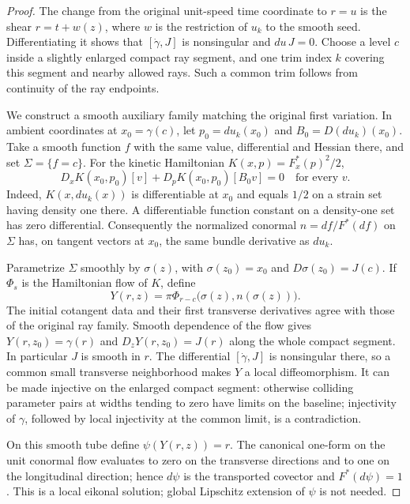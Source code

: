 \documentclass[11pt,reqno]{amsart}
\theoremstyle{definition}
\theoremstyle{remark}
\numberwithin{equation}{section}
\begin{document}
\begin{proof}
The change from the original unit-speed time coordinate to \(r=u\)
is the shear \(r=t+w(z)\), where \(w\) is the restriction of \(u_k\)
to the smooth seed. Differentiating it shows that
\([\dot\gamma,J]\) is nonsingular and \(du\,J=0\).
Choose a level \(c\) inside a slightly enlarged compact ray segment,
and one trim index \(k\) covering this segment and nearby allowed
rays. Such a common trim follows from continuity of the ray endpoints.

We construct a smooth auxiliary family matching the original first
variation. In ambient coordinates at \(x_0=\gamma(c)\), let
\(p_0=du_k(x_0)\) and \(B_0=D(du_k)(x_0)\). Take a smooth function
\(f\) with the same value, differential and Hessian there, and set
\(\Sigma=\{f=c\}\). For the kinetic Hamiltonian
\(K(x,p)=F_x^*(p)^2/2\),
\begin{equation}
D_xK(x_0,p_0)[v]+D_pK(x_0,p_0)[B_0v]=0
\quad\text{for every }v.
\label{eq:rough-eikonal-jet}
\end{equation}
Indeed, \(K(x,du_k(x))\) is differentiable at \(x_0\) and equals
\(1/2\) on a strain set having density one there. A differentiable
function constant on a density-one set has zero differential.
Consequently the normalized conormal
\(n=df/F^*(df)\) on \(\Sigma\) has, on tangent vectors at \(x_0\),
the same bundle derivative as \(du_k\).

Parametrize \(\Sigma\) smoothly by \(\sigma(z)\), with
\(\sigma(z_0)=x_0\) and \(D\sigma(z_0)=J(c)\). If \(\Phi_s\) is the Hamiltonian flow of
\(K\), define
\[
Y(r,z)=\pi\Phi_{r-c}\bigl(\sigma(z),n(\sigma(z))\bigr).
\]
The initial cotangent data and their first transverse derivatives
agree with those of the original ray family. Smooth dependence of
the flow gives
\(Y(r,z_0)=\gamma(r)\) and \(D_zY(r,z_0)=J(r)\) along the whole
compact segment. In particular \(J\) is smooth in \(r\).
The differential \([\dot\gamma,J]\) is nonsingular there, so a
common small transverse neighborhood makes \(Y\) a local
diffeomorphism. It can be made injective on the enlarged compact
segment: otherwise colliding parameter pairs at widths tending to
zero have limits on the baseline; injectivity of \(\gamma\), followed
by local injectivity at the common limit, is a contradiction.

On this smooth tube define \(\psi(Y(r,z))=r\). The canonical
one-form on the unit conormal flow evaluates to zero on the
transverse directions and to one on the longitudinal direction;
hence \(d\psi\) is the transported covector and \(F^*(d\psi)=1\).
This is a local eikonal solution; global Lipschitz extension of
\(\psi\) is not needed.


\end{proof}
\end{document}
